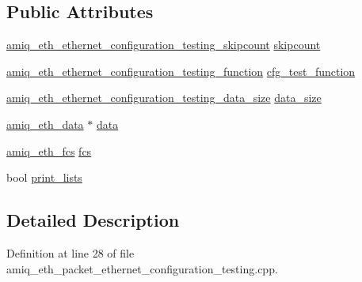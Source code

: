 \subsection*{Public Attributes}
\begin{DoxyCompactItemize}
\item 
\hyperlink{amiq__eth__types_8cpp_aaeb6b67f18d2fb2fcd870c5db61c5a9e}{amiq\_\-eth\_\-ethernet\_\-configuration\_\-testing\_\-skipcount} \hyperlink{classamiq__eth__packet__ethernet__configuration__testing_a0e0c3dab008be4317aa19dfbe1a75be1}{skipcount}
\item 
\hyperlink{amiq__eth__types_8cpp_a11e211f9a3ab99b4cf88c206bd785658}{amiq\_\-eth\_\-ethernet\_\-configuration\_\-testing\_\-function} \hyperlink{classamiq__eth__packet__ethernet__configuration__testing_a8f0790eac9bf1d803112ce23788e4fc7}{cfg\_\-test\_\-function}
\item 
\hyperlink{amiq__eth__types_8cpp_a1381089182c9f964cb292e74680df434}{amiq\_\-eth\_\-ethernet\_\-configuration\_\-testing\_\-data\_\-size} \hyperlink{classamiq__eth__packet__ethernet__configuration__testing_a296a5b8f577059bed0991b13b4337c83}{data\_\-size}
\item 
\hyperlink{amiq__eth__types_8cpp_a3595a0a508d433d383d3e5521fc0b723}{amiq\_\-eth\_\-data} $\ast$ \hyperlink{classamiq__eth__packet__ethernet__configuration__testing_a93c7b061e19eafe5aa00fdf822e26008}{data}
\item 
\hyperlink{amiq__eth__types_8cpp_adb511dc715b55539c6abdad1de981a9f}{amiq\_\-eth\_\-fcs} \hyperlink{classamiq__eth__packet__ethernet__configuration__testing_a5e8b2f14ebe61f3e98618033ebe246e4}{fcs}
\item 
bool \hyperlink{classamiq__eth__packet__ethernet__configuration__testing_a9804a9d571b8172916ee9dd61d1860c5}{print\_\-lists}
\end{DoxyCompactItemize}


\subsection{Detailed Description}


Definition at line 28 of file amiq\_\-eth\_\-packet\_\-ethernet\_\-configuration\_\-testing.cpp.

